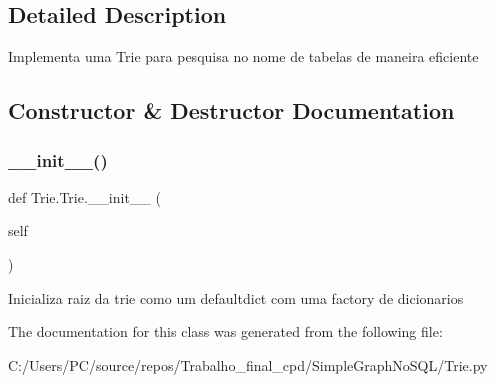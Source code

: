 \subsection{Detailed Description}
\begin{DoxyVerb}Implementa uma Trie para pesquisa no nome de tabelas de maneira eficiente\end{DoxyVerb}
 

\subsection{Constructor \& Destructor Documentation}
\mbox{\label{class_trie_1_1_trie_a9b9de44cd1cfcf4001d34b1c435c0dd0}} 
\subsubsection{\texorpdfstring{\+\_\+\+\_\+init\+\_\+\+\_\+()}{\_\_init\_\_()}}
{\footnotesize\ttfamily def Trie.\+Trie.\+\_\+\+\_\+init\+\_\+\+\_\+ (\begin{DoxyParamCaption}\item[{}]{self }\end{DoxyParamCaption})}

\begin{DoxyVerb}Inicializa raiz da trie como um defaultdict com uma factory de dicionarios\end{DoxyVerb}
 

The documentation for this class was generated from the following file\+:\begin{DoxyCompactItemize}
\item 
C\+:/\+Users/\+P\+C/source/repos/\+Trabalho\+\_\+final\+\_\+cpd/\+Simple\+Graph\+No\+S\+Q\+L/Trie.\+py\end{DoxyCompactItemize}
